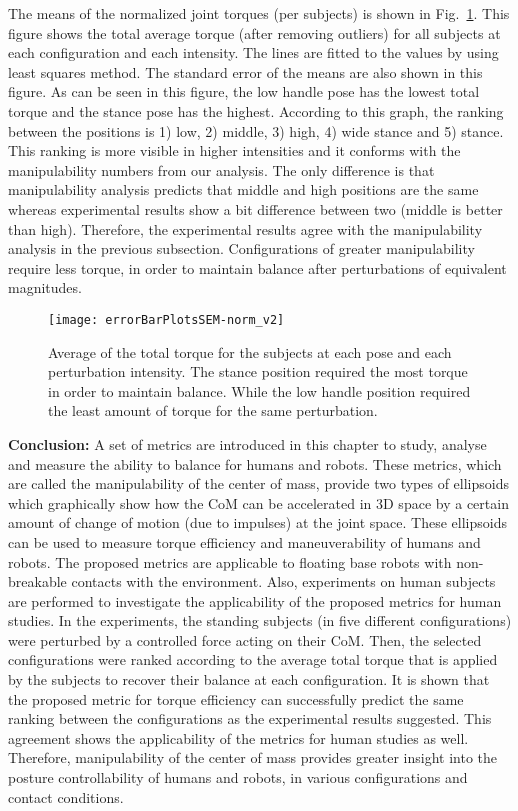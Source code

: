 The means of the normalized joint torques (per subjects) is shown in Fig.~\ref{jointtorque}. This figure shows the total average torque (after removing outliers) for all subjects at each configuration and each intensity. The lines are fitted to the values by using least squares method. The standard error of the means are also shown in this figure. As can be seen in this figure, the low handle pose has the lowest total torque and the stance pose has the highest. According to this graph, the ranking between the positions is 1) low, 2) middle, 3) high, 4) wide stance and 5) stance. This ranking is more visible in higher intensities and it conforms with the manipulability numbers from our analysis. The only difference is that manipulability analysis predicts that middle and high positions are the same whereas experimental results show a bit difference between two (middle is better than high). Therefore, the experimental results agree with the manipulability analysis in the previous subsection. Configurations of greater manipulability require less torque, in order to maintain balance after perturbations of equivalent magnitudes.
\begin{figure}
	\centering \texttt{[image: errorBarPlotsSEM-norm\_v2]}
	\caption{Average of the total torque for the subjects at each pose and each perturbation intensity. The stance position required the most torque in order to maintain balance. While the low handle position required the least amount of torque for the same perturbation.}
	\label{jointtorque}
\end{figure}


\textbf{Conclusion:} A set of metrics are introduced in this chapter to study, analyse and measure the ability to balance for humans and robots. These metrics, which are called the manipulability of the center of mass, provide two types of ellipsoids which graphically show how the CoM can be accelerated in 3D space by a certain amount of change of motion (due to impulses) at the joint space. These ellipsoids can be used to measure torque efficiency and maneuverability of humans and robots. The proposed metrics are applicable to floating base robots with non-breakable contacts with the environment. Also, experiments on human subjects are performed to investigate the applicability of the proposed metrics for human studies. In the experiments, the standing subjects (in five different configurations) were perturbed by a controlled force acting on their CoM. Then, the selected configurations were ranked according to the average total torque that is applied by the subjects to recover their balance at each configuration. It is shown that the proposed metric for torque efficiency can successfully predict the same ranking between the configurations as the experimental results suggested. This agreement shows the applicability of the metrics for human studies as well. Therefore, manipulability of the center of mass provides greater insight into the posture controllability of humans and robots, in various configurations and contact conditions.
